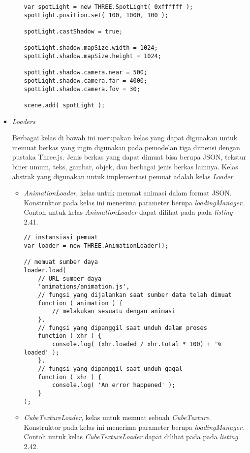 \begin{itemize}
\begin{itemize}
\begin{lstlisting}[caption={Contoh penggunaan kelas {\it SpotLight}.},captionpos=b]
var spotLight = new THREE.SpotLight( 0xffffff );
spotLight.position.set( 100, 1000, 100 );

spotLight.castShadow = true;

spotLight.shadow.mapSize.width = 1024;
spotLight.shadow.mapSize.height = 1024;

spotLight.shadow.camera.near = 500;
spotLight.shadow.camera.far = 4000;
spotLight.shadow.camera.fov = 30;

scene.add( spotLight );
\end{lstlisting}

	\end{itemize}
	
\item \textit{Loaders}

Berbagai kelas di bawah ini merupakan kelas yang dapat digunakan untuk memuat berkas yang ingin digunakan pada pemodelan tiga dimensi dengan pustaka Three.js. Jenis berkas yang dapat dimuat bisa berupa JSON, tekstur biner umum, teks, gambar, objek, dan berbagai jenis berkas lainnya. Kelas abstrak yang digunakan untuk implementasi pemuat adalah kelas {\it Loader}.
	\begin{itemize}
	\item {\it AnimationLoader}, kelas untuk memuat animasi dalam format JSON. Konstruktor pada kelas ini menerima parameter berupa {\it loadingManager}. Contoh untuk kelas {\it AnimationLoader} dapat dilihat pada pada {\it listing} 2.41.
	
\begin{lstlisting}[caption={Contoh penggunaan kelas {\it AnimationLoader}.},captionpos=b]
// instansiasi pemuat
var loader = new THREE.AnimationLoader();

// memuat sumber daya
loader.load(
	// URL sumber daya
	'animations/animation.js',
	// fungsi yang dijalankan saat sumber data telah dimuat
	function ( animation ) {
		// melakukan sesuatu dengan animasi
	},
	// fungsi yang dipanggil saat unduh dalam proses
	function ( xhr ) {
		console.log( (xhr.loaded / xhr.total * 100) + '% loaded' );
	},
	// fungsi yang dipanggil saat unduh gagal
	function ( xhr ) {
		console.log( 'An error happened' );
	}
);
\end{lstlisting}

	\item {\it CubeTextureLoader}, kelas untuk memuat sebuah {\it CubeTexture}. Konstruktor pada kelas ini menerima parameter berupa  {\it loadingManager}. Contoh untuk kelas {\it CubeTextureLoader} dapat dilihat pada pada {\it listing} 2.42.
	

\end{itemize}
\end{itemize}
